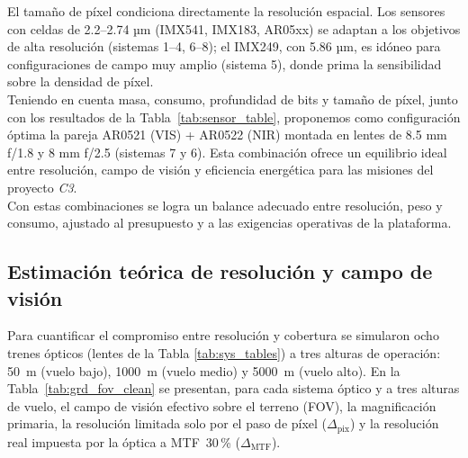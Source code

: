 \noindent El tamaño de píxel condiciona directamente la resolución espacial. Los sensores con celdas de 2.2–2.74 µm (IMX541, IMX183, AR05xx) se adaptan a los objetivos de alta resolución (sistemas 1–4, 6–8); el IMX249, con 5.86 µm, es idóneo para configuraciones de campo muy amplio (sistema 5), donde prima la sensibilidad sobre la densidad de píxel.\\

\noindent Teniendo en cuenta masa, consumo, profundidad de bits y tamaño de píxel, junto con los resultados de la Tabla~\ref{tab:sensor_table}, proponemos como configuración óptima la pareja AR0521 (VIS) + AR0522 (NIR) montada en lentes de 8.5 mm f/1.8 y 8 mm f/2.5 (sistemas 7 y 6). Esta combinación ofrece un equilibrio ideal entre resolución, campo de visión y eficiencia energética para las misiones del proyecto \textit{C3}.\\

\noindent Con estas combinaciones se logra un balance adecuado entre resolución, peso y consumo, ajustado al presupuesto y a las exigencias operativas de la plataforma.

\subsection{Estimación teórica de resolución y campo de visión}
\label{sec:cad_sim}

Para cuantificar el compromiso entre resolución y cobertura se simularon ocho
trenes ópticos (lentes de la Tabla \ref{tab:sys_tables}) a tres alturas de
operación: 50 m (vuelo bajo), 1000 m (vuelo medio) y 5000 m (vuelo alto). En la Tabla~\ref{tab:grd_fov_clean} se presentan, para cada sistema óptico y a tres alturas de vuelo, el campo de visión efectivo sobre el terreno (FOV), la magnificación primaria, la resolución limitada solo por el paso de píxel (\(\Delta_{\mathrm{pix}}\)) y la resolución real impuesta por la óptica a MTF 30\,\% (\(\Delta_{\mathrm{MTF}}\)).\\


